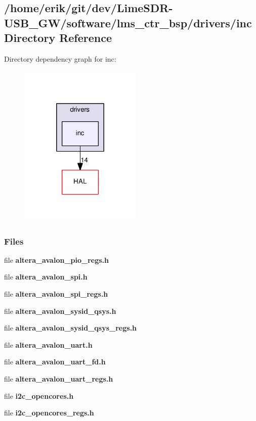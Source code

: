 \subsection{/home/erik/git/dev/\+Lime\+S\+D\+R-\/\+U\+S\+B\+\_\+\+G\+W/software/lms\+\_\+ctr\+\_\+bsp/drivers/inc Directory Reference}
\label{dir_2592be3d3557fb335ff798761fed5ffa}
Directory dependency graph for inc\+:
\nopagebreak
\begin{figure}[H]
\begin{center}
\leavevmode
\includegraphics[width=166pt]{dir_2592be3d3557fb335ff798761fed5ffa_dep}
\end{center}
\end{figure}
\subsubsection*{Files}
\begin{DoxyCompactItemize}
\item 
file {\bf altera\+\_\+avalon\+\_\+pio\+\_\+regs.\+h}
\item 
file {\bf altera\+\_\+avalon\+\_\+spi.\+h}
\item 
file {\bf altera\+\_\+avalon\+\_\+spi\+\_\+regs.\+h}
\item 
file {\bf altera\+\_\+avalon\+\_\+sysid\+\_\+qsys.\+h}
\item 
file {\bf altera\+\_\+avalon\+\_\+sysid\+\_\+qsys\+\_\+regs.\+h}
\item 
file {\bf altera\+\_\+avalon\+\_\+uart.\+h}
\item 
file {\bf altera\+\_\+avalon\+\_\+uart\+\_\+fd.\+h}
\item 
file {\bf altera\+\_\+avalon\+\_\+uart\+\_\+regs.\+h}
\item 
file {\bf i2c\+\_\+opencores.\+h}
\item 
file {\bf i2c\+\_\+opencores\+\_\+regs.\+h}
\end{DoxyCompactItemize}
